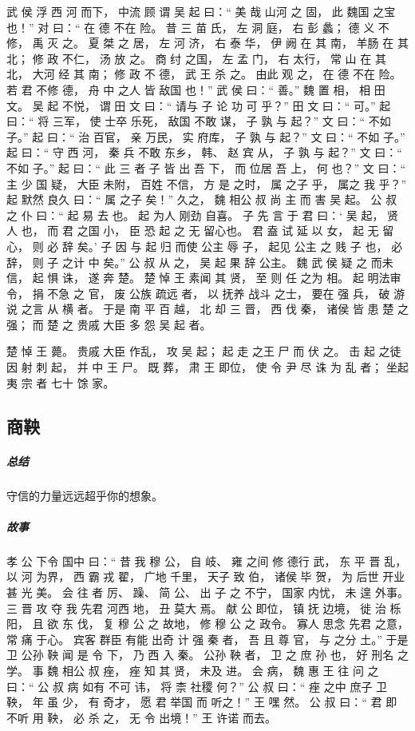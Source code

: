 \documentclass[UTF8,a4paper,8pt]{ctexbook}
\begin{document}
				武 侯 浮 西 河 而下， 中流 顾 谓 吴 起 曰：“ 美 哉 山河 之 固， 此 魏国 之宝 也！” 对 曰：“ 在 德 不在 险。 昔 三 苗 氏， 左 洞 庭， 右 彭 蠡； 德 义 不修， 禹 灭 之。 夏 桀 之 居， 左 河 济， 右 泰 华， 伊 阙 在 其 南， 羊肠 在 其 北； 修 政 不仁， 汤 放 之。 商 纣 之国， 左 孟 门， 右 太行， 常 山 在 其 北， 大河 经 其 南； 修 政 不 德， 武 王 杀 之。 由此 观 之， 在 德 不在 险。 若 君 不修 德， 舟 中 之人 皆 敌国 也！” 武 侯 曰：“ 善。” 魏 置 相， 相 田 文。 吴 起 不悦， 谓 田 文 曰：“ 请与 子 论 功 可 乎？” 田 文 曰：“ 可。” 起 曰：“ 将 三军， 使 士卒 乐死， 敌国 不敢 谋， 子 孰 与 起？” 文 曰：“ 不如 子。” 起 曰：“ 治 百官， 亲 万民， 实 府库， 子 孰 与 起？” 文 曰：“ 不如 子。” 起 曰：“ 守 西 河， 秦 兵 不敢 东乡， 韩、 赵 宾 从， 子 孰 与 起？” 文 曰：“ 不如 子。” 起 曰：“ 此 三 者 子 皆 出 吾 下， 而 位居 吾 上， 何 也？” 文 曰：“ 主 少 国 疑， 大臣 未附， 百姓 不信， 方 是 之时， 属 之子 乎， 属之 我 乎？” 起 默然 良久 曰：“ 属 之子 矣！” 久之， 魏 相公 叔 尚 主 而 害 吴 起。 公 叔 之 仆 曰：“ 起 易 去 也。 起 为人 刚劲 自喜。 子 先 言 于 君 曰：‘ 吴 起， 贤人 也， 而 君 之国 小， 臣 恐 起 之 无 留心也。 君 盍 试 延 以 女， 起 无 留心， 则 必 辞 矣。’ 子 因 与 起 归 而使 公主 辱 子， 起见 公主 之 贱 子 也， 必 辞， 则 子 之计 中 矣。” 公 叔 从 之， 吴 起 果 辞 公主。 魏 武 侯 疑 之 而未 信， 起 惧 诛， 遂 奔 楚。 楚 悼 王 素闻 其 贤， 至 则 任 之为 相。 起 明法审令， 捐 不急 之 官， 废 公族 疏远 者， 以 抚养 战斗 之士， 要在 强 兵， 破 游说 之言 从 横 者。 于是 南 平 百 越， 北 却 三 晋， 西 伐 秦， 诸侯 皆 患 楚 之 强； 而 楚 之 贵戚 大臣 多 怨 吴 起 者。
				
				楚 悼 王 薨。 贵戚 大臣 作乱， 攻 吴 起； 起 走 之王 尸 而 伏 之。 击 起 之徒 因 射 刺 起， 并 中 王 尸。 既 葬， 肃 王 即位， 使 令 尹 尽 诛 为 乱 者； 坐起 夷 宗 者 七十 馀 家。

		\subsection{商鞅}
			\subparagraph{总结}守信的力量远远超乎你的想象。
			
			\subparagraph{故事}
				孝 公 下令 国中 曰：“ 昔 我 穆 公， 自 岐、 雍 之间 修 德行 武， 东 平 晋 乱， 以 河 为界， 西 霸 戎 翟， 广地 千里， 天子 致 伯， 诸侯 毕 贺， 为 后世 开业 甚 光 美。 会 往 者 厉、 躁、 简 公、 出 子 之 不宁， 国家 内忧， 未 遑 外事。 三 晋 攻 夺 我 先君 河西 地， 丑 莫大 焉。 献 公 即位， 镇 抚 边境， 徙 治 栎 阳， 且 欲 东 伐， 复 穆 公 之 故地， 修 穆 公 之 政令。 寡人 思念 先君 之意， 常 痛 于心。 宾客 群臣 有能 出奇 计 强 秦 者， 吾 且 尊 官， 与 之分 土。” 于是 卫 公孙 鞅 闻 是 令 下， 乃 西 入 秦。 公孙 鞅 者， 卫 之 庶 孙 也， 好 刑名 之 学。 事 魏 相公 叔 痤， 痤 知 其 贤， 未及 进。 会 病， 魏 惠 王 往 问 之 曰：“ 公 叔 病 如有 不可 讳， 将 柰 社稷 何？” 公 叔 曰：“ 痤 之中 庶子 卫 鞅， 年 虽 少， 有 奇才， 愿 君 举国 而 听之！” 王 嘿 然。 公 叔 曰：“ 君 即 不听 用 鞅， 必 杀 之， 无 令 出境！” 王 许诺 而去。
				
\end{document}
